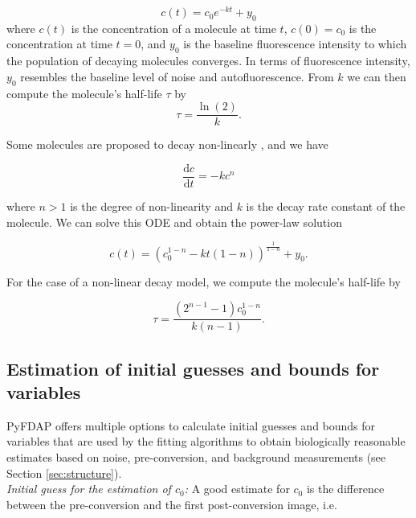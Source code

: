 \documentclass[a4paper,11pt]{article}
\begin{document}
\begin{equation*}
 c(t)=c_0 e^{-k t} + y_0
\end{equation*}
\noindent where $c(t)$ is the concentration of a molecule at time $t$, $c(0)=c_0$ is the concentration at time $t=0$, and $y_0$ is the baseline fluorescence intensity to which the population of decaying molecules converges. In terms of fluorescence intensity, $y_0$ resembles the baseline level of noise and autofluorescence. From $k$ we can then compute the molecule's half-life $\tau$ by
\begin{equation*}
 \tau= \frac{\ln(2)}{k}.
\end{equation*}

\noindent Some molecules are proposed to decay non-linearly \citep{Eldar2003}, and we have

\begin{equation*}
 \frac{\mathrm{d}c}{\mathrm{d}t} = -k c^n
\end{equation*}

\noindent where $n>1$ is the degree of non-linearity and $k$ is the decay rate constant of the molecule. We can solve this ODE and obtain the power-law solution

\begin{equation*}
 c(t)=\left(c_0^{1-n}  - kt(1-n)  \right)^{\frac{1}{1-n}}+ y_0.
\end{equation*}

\noindent For the case of a non-linear decay model, we compute the molecule's half-life by

\begin{equation*}
\tau=\frac{(2^{n-1}-1) c_0^{1-n}}{k(n-1)}.
\end{equation*}

\subsection{Estimation of initial guesses and bounds for variables}
\label{sec:bounds}
PyFDAP offers multiple options to calculate initial guesses and bounds for variables that are used by the fitting algorithms to obtain biologically reasonable estimates based on noise, pre-conversion, and background measurements (see Section \ref{sec:structure}).\\ 

\noindent \textit{Initial guess for the estimation of $c_0$:} A good estimate for $c_0$ is the difference between the pre-conversion and the first post-conversion image, i.e.
\end{document}
